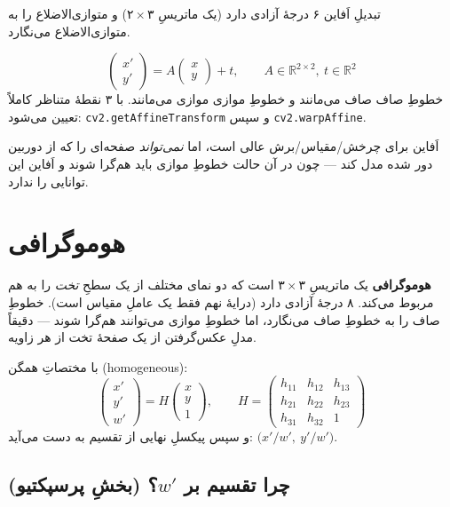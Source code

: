 \documentclass[12pt,a4paper]{article}
\begin{document}
تبدیلِ اَفاین ۶ درجهٔ آزادی دارد (یک ماتریسِ $۲\times۳$) و متوازی‌الاضلاع را به متوازی‌الاضلاع می‌نگارد.

\begin{riyazi}
\[
\begin{pmatrix}x'\\y'\end{pmatrix} = A\begin{pmatrix}x\\y\end{pmatrix} + t,\qquad A \in \mathbb{R}^{2\times2},\ t\in\mathbb{R}^2
\]
خطوطِ صاف صاف می‌مانند و خطوطِ موازی موازی می‌مانند. با ۳ نقطهٔ متناظر کاملاً تعیین می‌شود:
\texttt{cv2.getAffineTransform} و سپس \texttt{cv2.warpAffine}.
\end{riyazi}

اَفاین برای چرخش/مقیاس/برش عالی است، اما \emph{نمی‌تواند} صفحه‌ای را که از دوربین دور شده مدل کند — چون در آن حالت خطوطِ موازی باید هم‌گرا شوند و اَفاین این توانایی را ندارد.

\section{هوموگرافی}

\textbf{هوموگرافی} یک ماتریسِ $۳\times۳$ است که دو نمای مختلف از یک سطحِ \emph{تخت} را به هم مربوط می‌کند. ۸ درجهٔ آزادی دارد (درایهٔ نهم فقط یک عاملِ مقیاس است). خطوطِ صاف را به خطوطِ صاف می‌نگارد، اما خطوطِ موازی می‌توانند هم‌گرا شوند — دقیقاً مدلِ عکس‌گرفتن از یک صفحهٔ تخت از هر زاویه.

\begin{riyazi}
با مختصاتِ همگن (homogeneous):
\[
\begin{pmatrix}x'\\y'\\w'\end{pmatrix} = H \begin{pmatrix}x\\y\\1\end{pmatrix},
\qquad H=\begin{pmatrix} h_{11} & h_{12} & h_{13}\\ h_{21} & h_{22} & h_{23}\\ h_{31} & h_{32} & 1 \end{pmatrix}
\]
و سپس پیکسلِ نهایی از تقسیم به دست می‌آید: $\big(x'/w',\ y'/w'\big)$.
\end{riyazi}

\subsection{چرا تقسیم بر $w'$؟ (بخشِ پرسپکتیو)}
\end{document}
